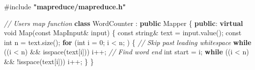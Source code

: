 \documentclass[
]{article}
\newenvironment{Shaded}{}{}
\newcommand{\AttributeTok}[1]{\textcolor[rgb]{0.49,0.56,0.16}{#1}}
\newcommand{\CommentTok}[1]{\textcolor[rgb]{0.38,0.63,0.69}{\textit{#1}}}
\newcommand{\ControlFlowTok}[1]{\textcolor[rgb]{0.00,0.44,0.13}{\textbf{#1}}}
\newcommand{\DataTypeTok}[1]{\textcolor[rgb]{0.56,0.13,0.00}{#1}}
\newcommand{\DecValTok}[1]{\textcolor[rgb]{0.25,0.63,0.44}{#1}}
\newcommand{\ImportTok}[1]{\textcolor[rgb]{0.00,0.50,0.00}{\textbf{#1}}}
\newcommand{\KeywordTok}[1]{\textcolor[rgb]{0.00,0.44,0.13}{\textbf{#1}}}
\newcommand{\NormalTok}[1]{#1}
\newcommand{\OperatorTok}[1]{\textcolor[rgb]{0.40,0.40,0.40}{#1}}
\newcommand{\PreprocessorTok}[1]{\textcolor[rgb]{0.74,0.48,0.00}{#1}}
\begin{document}
\begin{Shaded}
\begin{Highlighting}[]
\PreprocessorTok{\#include }\ImportTok{"mapreduce/mapreduce.h"}

\CommentTok{// User\textquotesingle{}s map function}
\KeywordTok{class}\NormalTok{ WordCounter }\OperatorTok{:} \KeywordTok{public}\NormalTok{ Mapper }\OperatorTok{\{}
    \KeywordTok{public}\OperatorTok{:}
    \KeywordTok{virtual} \DataTypeTok{void}\NormalTok{ Map}\OperatorTok{(}\AttributeTok{const}\NormalTok{ MapInput}\OperatorTok{\&}\NormalTok{ input}\OperatorTok{)} \OperatorTok{\{}
    \AttributeTok{const}\NormalTok{ string}\OperatorTok{\&}\NormalTok{ text }\OperatorTok{=}\NormalTok{ input}\OperatorTok{.}\NormalTok{value}\OperatorTok{();}
    \AttributeTok{const} \DataTypeTok{int}\NormalTok{ n }\OperatorTok{=}\NormalTok{ text}\OperatorTok{.}\NormalTok{size}\OperatorTok{();}
    \ControlFlowTok{for} \OperatorTok{(}\DataTypeTok{int}\NormalTok{ i }\OperatorTok{=} \DecValTok{0}\OperatorTok{;}\NormalTok{ i }\OperatorTok{\textless{}}\NormalTok{ n}\OperatorTok{;} \OperatorTok{)} \OperatorTok{\{}
    \CommentTok{// Skip past leading whitespace}
    \ControlFlowTok{while} \OperatorTok{((}\NormalTok{i }\OperatorTok{\textless{}}\NormalTok{ n}\OperatorTok{)} \OperatorTok{\&\&}\NormalTok{ isspace}\OperatorTok{(}\NormalTok{text}\OperatorTok{[}\NormalTok{i}\OperatorTok{]))}
\NormalTok{    i}\OperatorTok{++;}
    \CommentTok{// Find word end}
    \DataTypeTok{int}\NormalTok{ start }\OperatorTok{=}\NormalTok{ i}\OperatorTok{;}
    \ControlFlowTok{while} \OperatorTok{((}\NormalTok{i }\OperatorTok{\textless{}}\NormalTok{ n}\OperatorTok{)} \OperatorTok{\&\&} \OperatorTok{!}\NormalTok{isspace}\OperatorTok{(}\NormalTok{text}\OperatorTok{[}\NormalTok{i}\OperatorTok{]))}
\NormalTok{    i}\OperatorTok{++;}
    \OperatorTok{\}}
\OperatorTok{\}} 
\end{Highlighting}
\end{Shaded}
\end{document}
